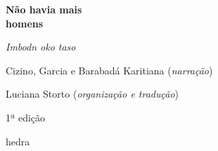 




\begingroup\thispagestyle{empty}\vspace*{.05\textheight} 

              {\formular
              \huge
              \noindent
              \textbf{Não havia mais\\homens}

              \vspace{0.5em}  
              
              \Large
              \noindent
              \textit{Imbodn oko taso}
              }
              \vspace{11em}
              
              {\small\noindent Cizino, Garcia e Barabadá Karitiana (\textit{narração})}

              {\small\noindent Luciana Storto (\textit{organização e tradução})}

              \bigskip

              \noindent
              {\small\noindent 1ª edição}

              \vfill

              \newfontfamily{}
              {\noindent\fontsize{30}{40}\selectfont \timesnewroman hedra}



\endgroup
\pagebreak
